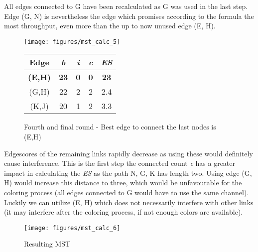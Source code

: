       All edges connected to G have been recalculated as G was used in the last step. Edge (G, N) is nevertheless the edge which promises according to 
      the formula the most throughput, even more than the up to now unused edge (E, H).
      
      \begin{figure}[h!]
	\centering
	\begin{minipage}{7.5cm}
	  \texttt{[image: figures/mst\_calc\_5]}
	\end{minipage}
	\begin{minipage}{4cm}
	  \begin{tabular}{c||c|c|c||c}
	    Edge & \textit{b} & \textit{i} & \textit{c} & \textit{ES}\\ \hline\hline
	    \textbf{(E,H)} & \textbf{23} & \textbf{0} & \textbf{0} & \textbf{23} \\ \hline
	    (G,H) & 22 & 2 & 2 & 2.4 \\ \hline
	    (K,J) & 20 & 1 & 2 & 3.3 \\ \hline
	  \end{tabular}
	\end{minipage}
	\caption{Fourth and final round - Best edge to connect the last nodes is (E,H)}
	\label{fig:mst_calc_5}
      \end{figure}
      
      Edgescores of the remaining links rapidly decrease as using these would definitely cause interference.
      This is the first step the connected count \textit{c} has a greater impact in calculating the \textit{ES} as the path N, G, K has length two.
      Using edge (G, H) would increase this distance to three, which would be unfavourable for the coloring process (all edges connected to G would have to use the same channel).
      Luckily we can utilize (E, H) which does not necessarily interfere with other links (it may interfere after the coloring process, if not enough colors are available).
      
      \begin{figure}[h!]
	\centering
	\begin{minipage}{7.5cm}
	  \texttt{[image: figures/mst\_calc\_6]}
	\end{minipage}
	\begin{minipage}{4cm}
	  \hspace{4cm}
	\end{minipage}
	\caption{Resulting MST}
	\label{fig:mst_calc_6}
      \end{figure}  
     \newpage
      
